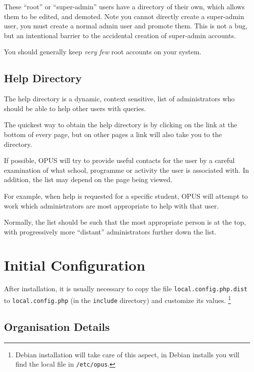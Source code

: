 \documentclass[12 pt]{book}
\begin{document}
These ``root'' or ``super-admin'' users have a directory of their own, which
allows them to be edited,
and demoted. Note you cannot directly create a super-admin user, you must 
create a normal admin user and promote them. This is not a bug, but an
intentional barrier to the accidental creation of super-admin accounts.

You should generally keep \emph{very few} root accounts on your system.

\section{Help Directory}

The help directory is a dynamic, context sensitive, list of administrators who
should be able to help other users with queries.

The quickest way to obtain the help directory is by clicking on the
 link at the bottom of every page, but on other pages
a  link will also take you to the directory.

If possible, OPUS will try to provide useful contacts for the user by a
careful examination of what school, programme or activity the user is
associated with. In addition, the list may depend on the page being viewed.

For example, when help is requested for a specific student, OPUS will attempt
to work which administrators are most appropriate to help with that user.

Normally, the list should be such that the most appropriate person is at the
top, with progressively more ``distant'' administrators further down the list.

\chapter{Initial Configuration}

After installation, it is usually necessary to copy the file
\lstinline!local.config.php.dist! to \lstinline!local.config.php! (in the 
\lstinline!include! directory) and customize its values.
\footnote{Debian installation will take care of this aspect, in Debian installs
you will find the local file in \lstinline!/etc/opus!.}

\section{Organisation Details}
\label{Organisation}
\end{document}
